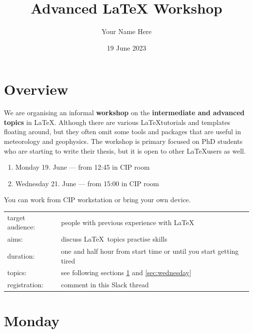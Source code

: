 \documentclass[a4paper,10pt]{report} %
\title{Advanced LaTeX Workshop}
\author{Your Name Here}
\date{19 June 2023}
\begin{document}


 \pagestyle{fancy}
\setcounter{page}{1}

 \section*{Overview}
 
 We are organising an informal \textbf{workshop} on the \textbf{intermediate and advanced topics} in \LaTeX.
Although there are various \LaTeX tutorials and templates floating around, but they often omit some tools and packages that are useful in meteorology and geophysics. The workshop is primary focused on PhD students who are starting to write their thesis, but it is open to other \LaTeX users as well.
 \begin{enumerate}
 \item  Monday 19. June --- from 12:45 in CIP room 
 \item  Wednesday 21. June --- from 15:00 in CIP room 
\end{enumerate}

\noindent
You can work from CIP workstation or bring your own device.~\\

 \begin{tabular}{l p{}}
   target audience: & people with previous experience with \LaTeX \\
   aims:  & discuss \LaTeX ~topics practise skills \\
   duration: & one and half hour from start time or until you start getting tired \\
   topics: & see following sections \ref{sec:monday} and \ref{sec:wednesday} \\
   registration: & comment in this Slack thread \\ 
 \end{tabular}

 
\section{Monday} \label{sec:monday}
\end{document}

